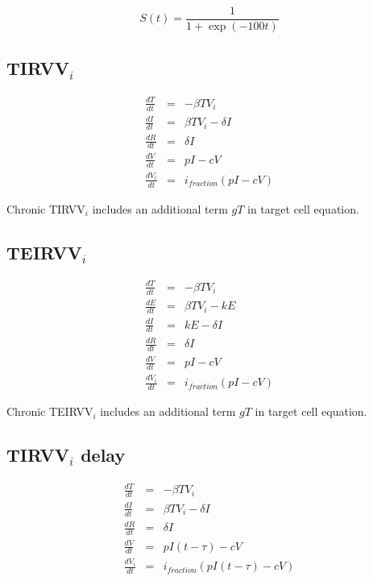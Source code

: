 \begin{equation}
S(t) = \frac{1}{1 + \exp(-100t)}
\end{equation}

\subsection{TIRVV$_i$}

\begin{equation}
\begin{array}{rcl}
\frac{dT}{dt} &=& - \beta T V_i \\
\frac{dI}{dt} &=& \beta T V_i - \delta I \\
\frac{dR}{dt} &=& \delta I \\
\frac{dV}{dt} &=& p I - c V\\
\frac{dV_i}{dt} &=& i_{fraction} (p I - c V)
\end{array}
\end{equation}

Chronic TIRVV$_i$ includes an additional term $g T$ in target cell equation.

\subsection{TEIRVV$_i$}

\begin{equation}
\begin{array}{rcl}
\frac{dT}{dt} &=& - \beta T V_i \\
\frac{dE}{dt} &=& \beta T V_i - k E \\
\frac{dI}{dt} &=& k E - \delta I \\
\frac{dR}{dt} &=& \delta I \\
\frac{dV}{dt} &=& p I - c V\\
\frac{dV_i}{dt} &=& i_{fraction} (p I - c V)
\end{array}
\end{equation}

Chronic TEIRVV$_i$ includes an additional term $g T$ in target cell equation.

\subsection{TIRVV$_i$ delay}

\begin{equation}
\begin{array}{rcl}
\frac{dT}{dt} &=& - \beta T V_i \\
\frac{dI}{dt} &=& \beta T V_i - \delta I \\
\frac{dR}{dt} &=& \delta I \\
\frac{dV}{dt} &=& p I (t - \tau) - c V\\
\frac{dV_i}{dt} &=& i_{fraction} (p I(t - \tau) - c V)
\end{array}
\end{equation}

